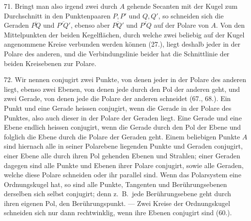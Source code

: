 71. Bringt man also irgend zwei durch $A$ gehende Secanten
mit der Kugel zum Durchschnitt in den Punktenpaaren
$P, P'$ und $Q, Q'$, so schneiden sich die Geraden $\overline{PQ}$
und $\overline{P'Q'}$, ebenso aber $\overline{PQ'}$ und $\overline{P'Q}$ auf der Polare von $A$.
Von den Mittelpunkten der beiden Kegelfl\"achen, durch welche
zwei beliebig auf der Kugel angenommene Kreise verbunden
werden k\"onnen (27.), liegt deshalb jeder in der Polare des
anderen, und die Verbindungslinie beider hat die Schnittlinie
der beiden Kreisebenen zur Polare.

72. Wir nennen {\glqq}conjugirt{\grqq} zwei Punkte, von denen
jeder in der Polare des anderen liegt, ebenso zwei Ebenen,
von denen jede durch den Pol der anderen geht, und zwei
Gerade, von denen jede die Polare der anderen schneidet
(67., 68.). Ein Punkt und eine Gerade heissen conjugirt,
wenn die Gerade in der Polare des Punktes, also auch dieser
in der Polare der Geraden liegt. Eine Gerade und eine
Ebene endlich heissen conjugirt, wenn die Gerade durch den
Pol der Ebene und folglich die Ebene durch die Polare der
Geraden geht. Einem beliebigen Punkte $A$ sind hiernach
alle in seiner Polarebene liegenden Punkte und Geraden conjugirt,
einer Ebene alle durch ihren Pol gehenden Ebenen
und Strahlen; einer Geraden dagegen sind alle Punkte und
Ebenen ihrer Polare conjugirt, sowie alle Geraden, welche
diese Polare schneiden oder ihr parallel sind. Wenn das
Polarsystem eine Ordnungskugel hat, so sind alle Punkte,
Tangenten und Ber\"uhrungsebenen derselben sich selbst conjugirt;
denn z.~B.\ jede Ber\"uhrungsebene geht durch ihren
eigenen Pol, den Ber\"uhrungspunkt. --- Zwei Kreise der
Ordnungskugel schneiden sich nur dann rechtwinklig, wenn ihre
Ebenen conjugirt sind (60.).

